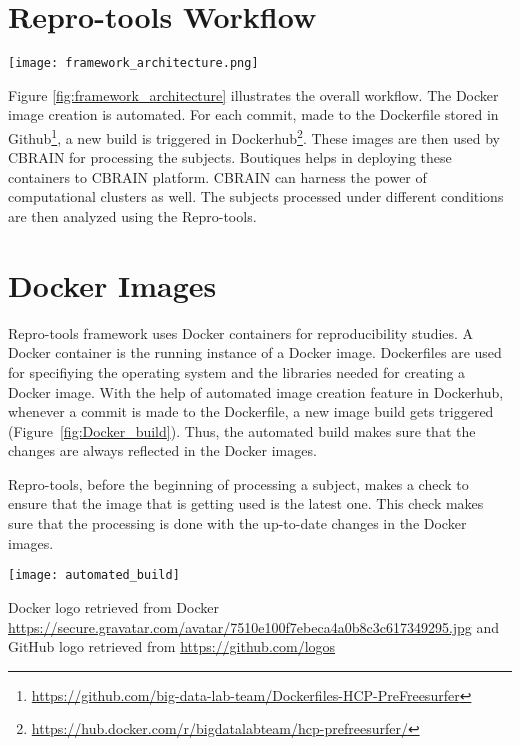 \section{Repro-tools Workflow}
\begin{center}
\texttt{[image: framework\_architecture.png]}
\label{fig:framework_architecture}
\end{center}
\vskip 0.2in

Figure \ref{fig:framework_architecture} illustrates the overall workflow. The Docker image creation is automated. For each commit, made to the Dockerfile stored in Github\footnote{\url{https://github.com/big-data-lab-team/Dockerfiles-HCP-PreFreesurfer}}, a new build is triggered in Dockerhub\footnote{\url{https://hub.docker.com/r/bigdatalabteam/hcp-prefreesurfer/}}. These images are then used by CBRAIN for processing the subjects. Boutiques helps in deploying these containers to CBRAIN platform. CBRAIN can harness the power of computational clusters as well. The subjects processed under different conditions are then analyzed using the Repro-tools.

\section{Docker Images}
Repro-tools framework uses Docker containers for reproducibility studies. A Docker container is the running instance of a Docker image. Dockerfiles are used for specifiying the operating system and the libraries needed for creating a Docker image. With the help of automated image creation feature in Dockerhub, whenever a commit is made to the Dockerfile, a new image build gets triggered (Figure~\ref{fig:Docker_build}). Thus, the automated build makes sure that the changes are always reflected in the Docker images.

Repro-tools, before the beginning of processing a subject, makes a check to ensure that the image that is getting used is the latest one. This check makes sure that the processing is done with the up-to-date changes in the Docker images.

\begin{center}
  \texttt{[image: automated\_build]}
  \label{fig:Docker_build}
  \caption*{Docker logo retrieved from Docker \url{https://secure.gravatar.com/avatar/7510e100f7ebeca4a0b8c3c617349295.jpg} and GitHub logo retrieved from \url{https://github.com/logos}}
\end{center}

